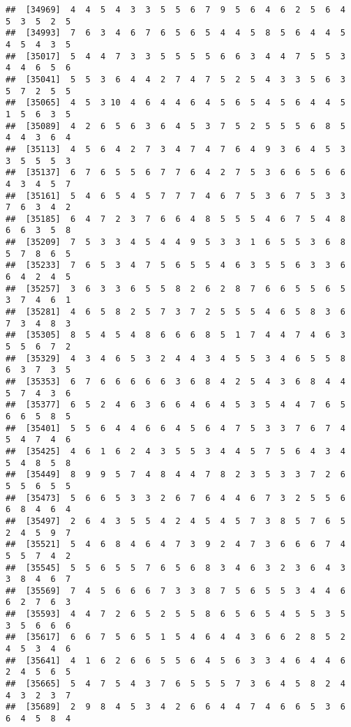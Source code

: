 \documentclass[
]{book}
\begin{document}
\begin{verbatim}
##  [34969]  4  4  5  4  3  3  5  5  6  7  9  5  6  4  6  2  5  6  4  5  3  5  2  5
##  [34993]  7  6  3  4  6  7  6  5  6  5  4  4  5  8  5  6  4  4  5  4  5  4  3  5
##  [35017]  5  4  4  7  3  3  5  5  5  5  6  6  3  4  4  7  5  5  3  4  4  6  5  6
##  [35041]  5  5  3  6  4  4  2  7  4  7  5  2  5  4  3  3  5  6  3  5  7  2  5  5
##  [35065]  4  5  3 10  4  6  4  4  6  4  5  6  5  4  5  6  4  4  5  1  5  6  3  5
##  [35089]  4  2  6  5  6  3  6  4  5  3  7  5  2  5  5  5  6  8  5  4  4  3  6  4
##  [35113]  4  5  6  4  2  7  3  4  7  4  7  6  4  9  3  6  4  5  3  3  5  5  5  3
##  [35137]  6  7  6  5  5  6  7  7  6  4  2  7  5  3  6  6  5  6  6  4  3  4  5  7
##  [35161]  5  4  6  5  4  5  7  7  7  4  6  7  5  3  6  7  5  3  3  7  6  3  4  2
##  [35185]  6  4  7  2  3  7  6  6  4  8  5  5  5  4  6  7  5  4  8  6  6  3  5  8
##  [35209]  7  5  3  3  4  5  4  4  9  5  3  3  1  6  5  5  3  6  8  5  7  8  6  5
##  [35233]  7  6  5  3  4  7  5  6  5  5  4  6  3  5  5  6  3  3  6  6  4  2  4  5
##  [35257]  3  6  3  3  6  5  5  8  2  6  2  8  7  6  6  5  5  6  5  3  7  4  6  1
##  [35281]  4  6  5  8  2  5  7  3  7  2  5  5  5  4  6  5  8  3  6  7  3  4  8  3
##  [35305]  8  5  4  5  4  8  6  6  6  8  5  1  7  4  4  7  4  6  3  5  5  6  7  2
##  [35329]  4  3  4  6  5  3  2  4  4  3  4  5  5  3  4  6  5  5  8  6  3  7  3  5
##  [35353]  6  7  6  6  6  6  6  3  6  8  4  2  5  4  3  6  8  4  4  5  7  4  3  6
##  [35377]  6  5  2  4  6  3  6  6  4  6  4  5  3  5  4  4  7  6  5  6  6  5  8  5
##  [35401]  5  5  6  4  4  6  6  4  5  6  4  7  5  3  3  7  6  7  4  5  4  7  4  6
##  [35425]  4  6  1  6  2  4  3  5  5  3  4  4  5  7  5  6  4  3  4  5  4  8  5  8
##  [35449]  8  9  9  5  7  4  8  4  4  7  8  2  3  5  3  3  7  2  6  5  5  6  5  5
##  [35473]  5  6  6  5  3  3  2  6  7  6  4  4  6  7  3  2  5  5  6  6  8  4  6  4
##  [35497]  2  6  4  3  5  5  4  2  4  5  4  5  7  3  8  5  7  6  5  2  4  5  9  7
##  [35521]  5  4  6  8  4  6  4  7  3  9  2  4  7  3  6  6  6  7  4  5  5  7  4  2
##  [35545]  5  5  6  5  5  7  6  5  6  8  3  4  6  3  2  3  6  4  3  3  8  4  6  7
##  [35569]  7  4  5  6  6  6  7  3  3  8  7  5  6  5  5  3  4  4  6  6  2  7  6  3
##  [35593]  4  4  7  2  6  5  2  5  5  8  6  5  6  5  4  5  5  3  5  3  5  6  6  6
##  [35617]  6  6  7  5  6  5  1  5  4  6  4  4  3  6  6  2  8  5  2  4  5  3  4  6
##  [35641]  4  1  6  2  6  6  5  5  6  4  5  6  3  3  4  6  4  4  6  2  4  5  6  5
##  [35665]  5  4  7  5  4  3  7  6  5  5  5  7  3  6  4  5  8  2  4  4  3  2  3  7
##  [35689]  2  9  8  4  5  3  4  2  6  6  4  4  7  4  6  6  5  3  6  6  4  5  8  4

\end{verbatim}
\end{document}
